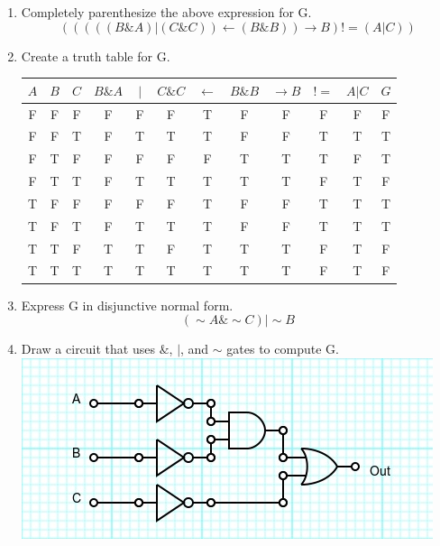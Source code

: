\documentclass{article}
\begin{document}
\begin{enumerate}
\begin{enumerate}
        \item Completely parenthesize the above expression for G.
        $$(((((B\&A)|(C\&C))\leftarrow (B\&B))\rightarrow B)!=(A|C))$$
        
        \item Create a truth table for G.\\
        \begin{tabular}{ |c|c|c|c|c|c|c|c|c|c|c|c| } 
            \hline
            $A$ & $B$ & $C$ & $B\&A$ & $|$ & $C\&C$ & $\leftarrow$ & $B\&B$ & $\rightarrow B$ & $!=$ & $A|C$ & $G$\\ 
            \hline
            F & F & F & F & F & F & T & F & F & F & F & F\\ 
            \hline
            F & F & T & F & T & T & T & F & F & T & T & T\\ 
            \hline
            F & T & F & F & F & F & F & T & T & T & F & T\\ 
            \hline
            F & T & T & F & T & T & T & T & T & F & T & F\\ 
            \hline
            T & F & F & F & F & F & T & F & F & T & T & T\\ 
            \hline
            T & F & T & F & T & T & T & F & F & T & T & T\\ 
            \hline
            T & T & F & T & T & F & T & T & T & F & T & F\\ 
            \hline
            T & T & T & T & T & T & T & T & T & F & T & F\\ 
            \hline
        \end{tabular}

        \item Express G in disjunctive normal form.
        $$(\sim A \& \sim C) | \sim B$$

        \item Draw a circuit that uses $\&$, $\mid$, and $\sim$ gates to 
        compute G.\\
        \includegraphics[scale=.9]{4d}
    \end{enumerate}
    

\end{enumerate}
\end{document}
